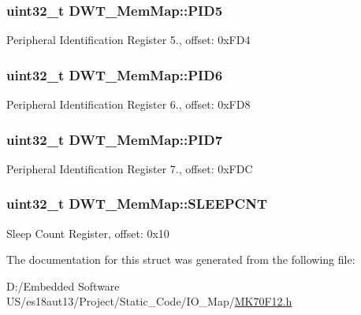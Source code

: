 \subsubsection[{P\+I\+D5}]{\setlength{\rightskip}{0pt plus 5cm}uint32\+\_\+t D\+W\+T\+\_\+\+Mem\+Map\+::\+P\+I\+D5}\label{struct_d_w_t___mem_map_a8b21a1c5290151d5474deb51c391b85b}
Peripheral Identification Register 5., offset\+: 0x\+F\+D4 \hypertarget{struct_d_w_t___mem_map_a7c3faa2d806e506a32d9d3283e3717c2}{}
\subsubsection[{P\+I\+D6}]{\setlength{\rightskip}{0pt plus 5cm}uint32\+\_\+t D\+W\+T\+\_\+\+Mem\+Map\+::\+P\+I\+D6}\label{struct_d_w_t___mem_map_a7c3faa2d806e506a32d9d3283e3717c2}
Peripheral Identification Register 6., offset\+: 0x\+F\+D8 \hypertarget{struct_d_w_t___mem_map_af0158099ec07706eef6138a50643e1c8}{}
\subsubsection[{P\+I\+D7}]{\setlength{\rightskip}{0pt plus 5cm}uint32\+\_\+t D\+W\+T\+\_\+\+Mem\+Map\+::\+P\+I\+D7}\label{struct_d_w_t___mem_map_af0158099ec07706eef6138a50643e1c8}
Peripheral Identification Register 7., offset\+: 0x\+F\+D\+C \hypertarget{struct_d_w_t___mem_map_a0c31354b6fe3f3dd79bc5b768bea4f46}{}
\subsubsection[{S\+L\+E\+E\+P\+C\+N\+T}]{\setlength{\rightskip}{0pt plus 5cm}uint32\+\_\+t D\+W\+T\+\_\+\+Mem\+Map\+::\+S\+L\+E\+E\+P\+C\+N\+T}\label{struct_d_w_t___mem_map_a0c31354b6fe3f3dd79bc5b768bea4f46}
Sleep Count Register, offset\+: 0x10 

The documentation for this struct was generated from the following file\+:\begin{DoxyCompactItemize}
\item 
D\+:/\+Embedded Software U\+S/es18aut13/\+Project/\+Static\+\_\+\+Code/\+I\+O\+\_\+\+Map/\hyperlink{_m_k70_f12_8h}{M\+K70\+F12.\+h}\end{DoxyCompactItemize}
